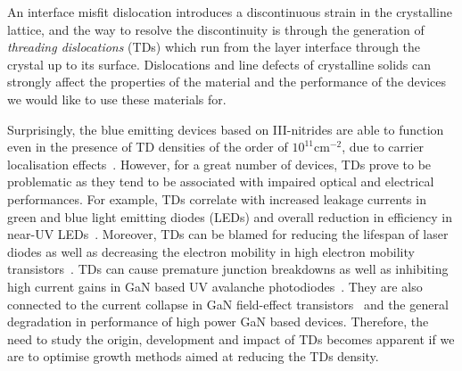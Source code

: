 An interface misfit dislocation introduces a discontinuous strain in the crystalline lattice, and the way to resolve the discontinuity is through the generation of \textit{threading dislocations} (TDs) which run from the layer interface through the crystal up to its surface. Dislocations and line defects of crystalline solids can strongly affect the properties of the material and the performance of the devices we would like to use these materials for.

Surprisingly, the blue emitting devices based on III-nitrides are able to function even in the presence of TD  densities of the order of $10^{11}$cm$^{-2}$, due to carrier localisation effects~\cite{Graham}. However, for a great number of devices, TDs prove to be problematic as they tend to be associated with impaired optical and electrical performances. For example, TDs correlate with increased leakage currents in green and blue light emitting diodes (LEDs) \cite{Ferdous} and overall reduction in efficiency in near-UV LEDs~\cite{Kamiyama}. Moreover, TDs can be blamed for reducing the lifespan of laser diodes as well as decreasing the electron mobility in high electron mobility transistors~\cite{Bougrioua}. TDs can cause premature junction breakdowns as well as inhibiting high current gains in GaN based UV avalanche photodiodes~\cite{Limb}. They are also connected to the current collapse in GaN field-effect transistors~\cite{Disanto} and the general degradation in performance of high power GaN based devices. Therefore, the need to study the origin, development and impact of TDs becomes apparent if we are to optimise growth methods aimed at reducing the TDs density.



